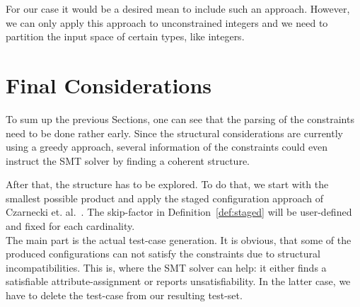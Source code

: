 For our case it would be a desired mean to include such an approach. However, we can only apply this approach to unconstrained integers and we need to partition the input space of certain types, like integers.


\section{Final Considerations}\label{sec:final}

To sum up the previous Sections, one can see that the parsing of the constraints need to be done rather early. Since the structural considerations are currently using a greedy approach, several information of the constraints could even instruct the SMT solver by finding a coherent structure.

After that, the structure has to be explored. To do that, we start with the smallest possible product and apply the staged configuration approach of Czarnecki et. al.~\cite{card-based-feature-models-formalization}. The skip-factor in Definition~\ref{def:staged} will be user-defined and fixed for each cardinality.\\


The main part is the actual test-case generation. It is obvious, that some of the produced configurations can not satisfy the constraints due to structural incompatibilities. This is, where the SMT solver can help: it either finds a satisfiable attribute-assignment or reports unsatisfiability. In the latter case, we have to delete the test-case from our resulting test-set.

